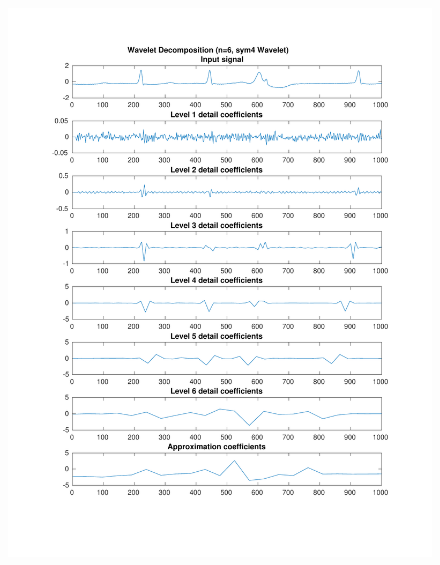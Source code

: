 \documentclass{beamer}
\begin{document}
\begin{frame}
\begin{columns}
\begin{figure}
\includegraphics[width=\textwidth]{fig/221l1_dwt2.pdf}
\end{figure}
\end{columns}
\end{frame}
\end{document}
